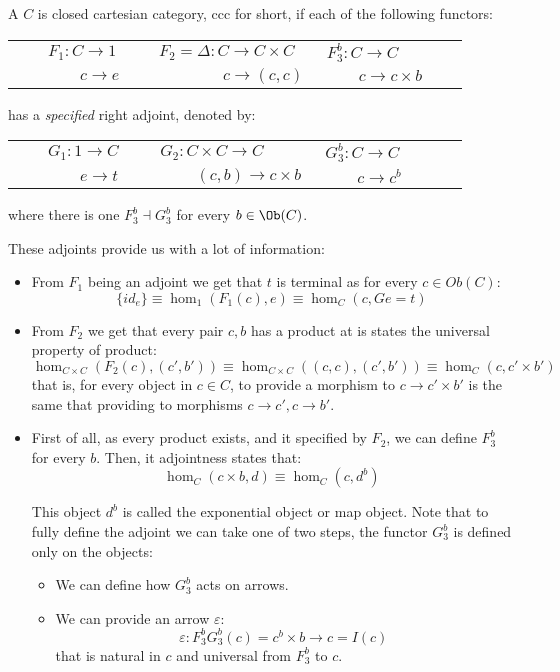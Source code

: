 \begin{definition}\label{def:CCC}
  A $C$ is closed cartesian category, ccc for short, if each of the following functors:
  \begin{center}
    \begin{tabular}{p{0.3\linewidth}p{0.3\linewidth}p{0.3\linewidth}}
      $\qquad F_1:C\to 1$&$ F_2=\Delta: C \to C\times C $&$ F_{3}^b:C \to C$\\
      $\qquad \qquad c\to e$&$ \qquad \qquad c \to  (c,c)$&$ \qquad c \to c\times b$\\
    \end{tabular}
  \end{center}
  has a \emph{specified} right adjoint, denoted by:
  \begin{center}
    \begin{tabular}{p{0.3\linewidth}p{0.3\linewidth}p{0.3\linewidth}}
      $\qquad G_1:1\to C$&$ G_2:  C\times C\to C $&$ G_{3}^b:C \to C$\\
      $\qquad \qquad e\to t$&$ \  \qquad (c,b)\to c \times b$&$ \qquad c \to c^b$\\
    \end{tabular}
    where there is one $F_3^b\dashv G_3^b$ for every $b\in \Ob(C)$.
  \end{center}

  These adjoints provide us with a lot of information:
  \begin{itemize}
  \item From $F_1$ being an adjoint we get that $t$ is terminal as for every $c\in Ob(C)$:
    $$\{id_e\} \equiv \hom_1(F_1(c), e) \equiv \hom_C(c,Ge=t)   $$
  \item From $F_2$ we get that every pair $c,b$ has a product at is states the universal property of product:
    $$\hom_{C\times C}(F_2(c), (c',b'))\equiv \hom_{C\times C}((c,c), (c',b')) \equiv \hom_C(c,c'\times b')$$
    that is, for every object in $c\in C$, to provide a morphism to $c\to c'\times b'$ is the same that providing to morphisms $c\to c',c\to b'$.
  \item First of all, as every product exists, and it specified by $F_2$, we can define $F_3^b$ for every $b$. Then, it adjointness states that:
    $$\hom_C(c\times b, d) \equiv \hom_C(c,d^b)   $$

    This object $d^b$ is called the exponential object or map object. Note that to fully define the adjoint we can take one of two steps,  the functor $G_3^b$ is defined only on the objects:
    \begin{itemize}
    \item We can define how $G_3^b$ acts on arrows.
    \item We can  provide an arrow $\varepsilon$:
      $$\varepsilon: F_3^bG_3^b(c) = c^b\times b \to c = I(c)$$
      that is natural in $c$ and universal from $F_3^b$ to $c$.
    \end{itemize}


\end{itemize}
\end{definition}
